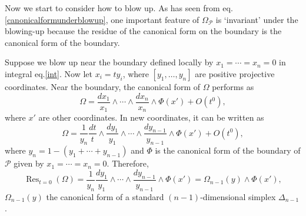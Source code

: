 \documentclass[12pt]{article}
\theoremstyle{definition}
\theoremstyle{plain}
\begin{document}

Now we start to consider how to blow up. As has seen from eq.\eqref{canonicalformunderblowup}, one important feature of $\Omega_{\mathcal P}$ is `invariant' under the blowing-up because the residue of the canonical form on the boundary is the canonical form of the boundary.

Suppose we blow up near the boundary defined locally by $x_1=\cdots=x_n=0$ in integral eq.\eqref{int}. Now let $x_i=ty_i$, where $[y_1,\dots,y_n]$ are positive projective coordinates. Near the boundary, the canonical form of $\Omega$ performs as 
\[
	\Omega=\frac{dx_1}{x_1}\wedge \cdots\wedge\frac{dx_n}{x_n}
	\wedge \Phi(x')+O(t^0),
\]
where $x'$ are other coordinates. In new coordinates, it can be written as 
\[
	\Omega=\frac{1}{y_n}\frac{dt}{t}\wedge \frac{dy_1}{y_1}\wedge \cdots\wedge\frac{dy_{n-1}}{y_{n-1}}\wedge \Phi(x')+O(t^0),
\]
where $y_n=1-(y_1+\cdots+y_{n-1})$ and $\Phi$ is the canonical form of the boundary of $\mathcal P$ given by $x_1=\cdots=x_n=0$. Therefore,
\[
	\operatorname{Res}_{t=0}(\Omega)=\frac{1}{y_n}\frac{dy_1}{y_1}\wedge \cdots\wedge\frac{dy_{n-1}}{y_{n-1}}\wedge \Phi(x')=\Omega_{n-1}(y)\wedge \Phi(x'),
\]
$\Omega_{n-1}(y)$ the canonical form of a standard $(n-1)$-dimensional simplex $\Delta_{n-1}$. 
\end{document}
